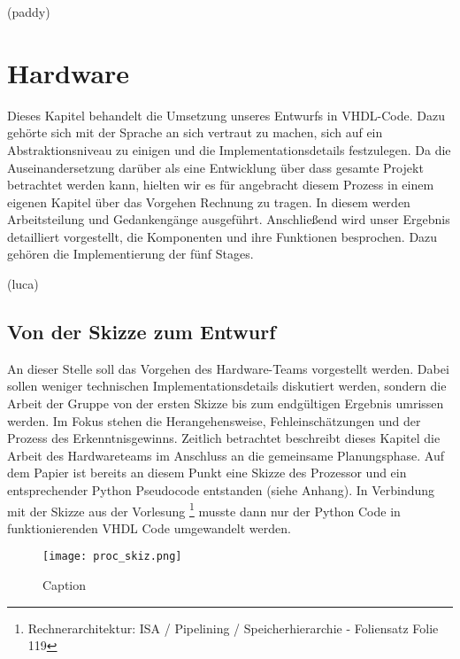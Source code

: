 \documentclass[paper=a4,fontsize=12pt,twocolumn]{scrreprt}
\begin{document}
(paddy)

\chapter{Hardware}

Dieses Kapitel behandelt die Umsetzung unseres Entwurfs in VHDL-Code.
Dazu gehörte sich mit der Sprache an sich vertraut zu machen, sich auf ein Abstraktionsniveau zu einigen und die Implementationsdetails festzulegen.
Da die Auseinandersetzung darüber als eine Entwicklung über dass gesamte Projekt betrachtet werden kann, hielten wir es für angebracht diesem Prozess in einem eigenen Kapitel über das Vorgehen Rechnung zu tragen.
In diesem werden Arbeitsteilung und Gedankengänge ausgeführt. %
Anschließend wird unser Ergebnis detailliert vorgestellt, die Komponenten und ihre Funktionen besprochen. Dazu gehören die Implementierung der fünf Stages. %



(luca)

\section{Von der Skizze zum Entwurf}

An dieser Stelle soll das Vorgehen des Hardware-Teams vorgestellt werden.
Dabei sollen weniger technischen Implementationsdetails diskutiert werden, sondern die Arbeit der Gruppe von der ersten Skizze bis zum endgültigen Ergebnis umrissen werden.
Im Fokus stehen die Herangehensweise, Fehleinschätzungen und der Prozess des Erkenntnisgewinns.
Zeitlich betrachtet beschreibt dieses Kapitel die Arbeit des Hardwareteams im Anschluss an die gemeinsame Planungsphase.
Auf dem Papier ist bereits an diesem Punkt eine Skizze des Prozessor und ein entsprechender Python Pseudocode entstanden (siehe Anhang).
In Verbindung mit der Skizze aus der Vorlesung \footnote{Rechnerarchitektur: ISA / Pipelining / Speicherhierarchie - Foliensatz Folie 119} musste dann nur der Python Code in funktionierenden VHDL Code umgewandelt werden.

\begin{figure}
    \centering
    \texttt{[image: proc\_skiz.png]}
    \caption{Caption}
    \label{fig:my_label}
\end{figure}
\end{document}
